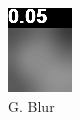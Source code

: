 \begin{figure}[H]
\begin{subfigure}[t]{0.15\textwidth}
    \includegraphics[width=\linewidth]{img/one-trial/loss_eval/L1/stimulus_1_blur_65_10_L1.png}
    \caption{G. Blur}
  \end{subfigure}
  \begin{subfigure}[t]{0.15\textwidth}
    \centering

\end{subfigure}
\end{figure}
